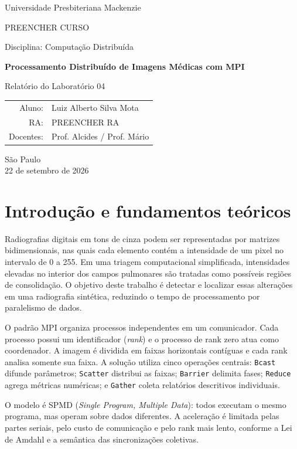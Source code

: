 \documentclass[12pt,a4paper]{article}
\newcommand{\NomeAluno}{Luiz Alberto Silva Mota}
\newcommand{\RAAluno}{PREENCHER RA}
\newcommand{\CursoAluno}{PREENCHER CURSO}
\newcommand{\DataEntrega}{22 de setembro de 2026}
\begin{document}
\begin{titlepage}
  \centering
  {\large Universidade Presbiteriana Mackenzie\par}
  \vspace{1.4cm}
  {\large \CursoAluno\par}
  {\large Disciplina: Computação Distribuída\par}
  \vfill
  {\LARGE\bfseries Processamento Distribuído de Imagens Médicas com MPI\par}
  \vspace{0.8cm}
  {\large Relatório do Laboratório 04\par}
  \vfill
  \begin{tabular}{rl}
    Aluno: & \NomeAluno \\
    RA: & \RAAluno \\
    Docentes: & Prof. Alcides / Prof. Mário \\
  \end{tabular}
  \vfill
  São Paulo\\
  \DataEntrega
\end{titlepage}

\tableofcontents
\newpage

\section{Introdução e fundamentos teóricos}

Radiografias digitais em tons de cinza podem ser representadas por matrizes
bidimensionais, nas quais cada elemento contém a intensidade de um pixel no
intervalo de 0 a 255. Em uma triagem computacional simplificada, intensidades
elevadas no interior dos campos pulmonares são tratadas como possíveis regiões
de consolidação. O objetivo deste trabalho é detectar e localizar essas
alterações em uma radiografia sintética, reduzindo o tempo de processamento por
paralelismo de dados.

O padrão MPI organiza processos independentes em um comunicador. Cada processo
possui um identificador (\emph{rank}) e o processo de rank zero atua como
coordenador. A imagem é dividida em faixas horizontais contíguas e cada rank
analisa somente sua faixa. A solução utiliza cinco operações centrais:
\texttt{Bcast} difunde parâmetros; \texttt{Scatter} distribui as faixas;
\texttt{Barrier} delimita fases; \texttt{Reduce} agrega métricas numéricas; e
\texttt{Gather} coleta relatórios descritivos individuais.

O modelo é SPMD (\emph{Single Program, Multiple Data}): todos executam o mesmo
programa, mas operam sobre dados diferentes. A aceleração é limitada pelas
partes seriais, pelo custo de comunicação e pelo rank mais lento, conforme a
Lei de Amdahl e a semântica das sincronizações coletivas.
\end{document}
